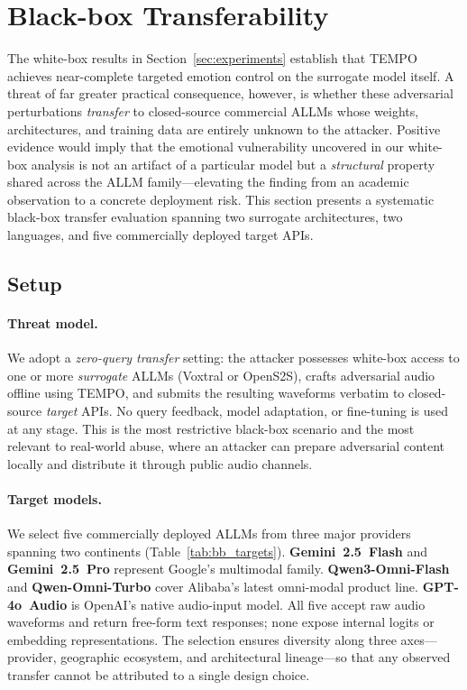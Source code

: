
\section{Black-box Transferability}
\label{sec:blackbox}

The white-box results in Section~\ref{sec:experiments} establish that TEMPO achieves near-complete targeted emotion control on the surrogate model itself.
A threat of far greater practical consequence, however, is whether these adversarial perturbations \emph{transfer} to closed-source commercial ALLMs whose weights, architectures, and training data are entirely unknown to the attacker.
Positive evidence would imply that the emotional vulnerability uncovered in our white-box analysis is not an artifact of a particular model but a \emph{structural} property shared across the ALLM family---elevating the finding from an academic observation to a concrete deployment risk.
This section presents a systematic black-box transfer evaluation spanning two surrogate architectures, two languages, and five commercially deployed target APIs.

\subsection{Setup}
\label{sec:bb_setup}

\paragraph{Threat model.}
We adopt a \emph{zero-query transfer} setting: the attacker possesses white-box access to one or more \emph{surrogate} ALLMs (Voxtral or OpenS2S), crafts adversarial audio offline using TEMPO, and submits the resulting waveforms verbatim to closed-source \emph{target} APIs.
No query feedback, model adaptation, or fine-tuning is used at any stage.
This is the most restrictive black-box scenario and the most relevant to real-world abuse, where an attacker can prepare adversarial content locally and distribute it through public audio channels.

\paragraph{Target models.}
We select five commercially deployed ALLMs from three major providers spanning two continents (Table~\ref{tab:bb_targets}).
\textbf{Gemini~2.5~Flash} and \textbf{Gemini~2.5~Pro} represent Google's multimodal family.
\textbf{Qwen3-Omni-Flash} and \textbf{Qwen-Omni-Turbo} cover Alibaba's latest omni-modal product line.
\textbf{GPT-4o~Audio} is OpenAI's native audio-input model.
All five accept raw audio waveforms and return free-form text responses; none expose internal logits or embedding representations.
The selection ensures diversity along three axes---provider, geographic ecosystem, and architectural lineage---so that any observed transfer cannot be attributed to a single design choice.

